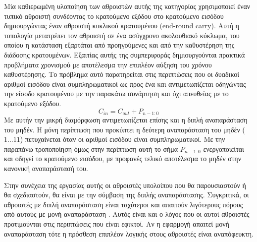 Μία καθιερωμένη υλοποίηση των αθροιστών αυτής της κατηγορίας χρησιμοποιεί έναν τυπικό αθροιστή
συνδέοντας το κρατούμενο εξόδου στο κρατούμενο εισόδου δημιουργώντας έναν αθροιστή κυκλικού
κρατουμένου (end-round carry). Αυτή η τοπολογία μετατρέπει τον αθροιστή σε ένα ασύγχρονο 
ακολουθιακό κύκλωμα, του οποίου η κατάσταση εξαρτάται από προηγούμενες και από την 
καθυστέρηση της διάδοσης κρατουμένων. Εξαιτίας αυτής της συμπεριφοράς δημιουργούνται
πρακτικά προβλήματα χρονισμού με αποτέλεσμα την επιπλέον αύξηση του χρόνου καθυστέρησης.
Το πρόβλημα αυτό παρατηρείται στις περιπτώσεις που οι δυαδικοί αριθμοί εισόδου 
είναι συμπληρωματικοί ως προς ένα και αντιμετωπίζεται \cite{1674817} οδηγώντας την είσοδο 
κρατουμένου με την παρακάτω συνάρτηση και όχι απευθείας με το κρατούμενο εξόδου.
\begin{equation}
    C_{in} = C_{out} + P_{n-1:0}
\end{equation}
Με αυτήν την μικρή διαμόρφωση αντιμετωπίζεται επίσης και η διπλή αναπαράσταση του μηδέν.
Η μόνη περίπτωση που προκύπτει η δεύτερη αναπαράσταση του μηδέν ($1...11$) πετυχαίνεται
όταν οι αριθμοί εισόδου είναι συμπληρωματικοί. Με την παραπάνω τροποποίηση όμως στην περίπτωση αυτή το σήμα $P_{n-1:0}$ ενεργοποιείται και οδηγεί το κρατούμενο εισόδου, 
με προφανές τελικό αποτέλεσμα το μηδέν στην κανονική αναπαράστασή του.

Στην συνέχεια της εργασίας αυτής οι αθροιστές υπολοίπου που θα παρουσιαστούν ή θα 
σχεδιαστούν, θα είναι με την σύμβαση της διπλής αναπαράστασης. Συγκριτικά, οι αθροιστές
με διπλή αναπαράσταση είναι ταχύτεροι και απαιτούν λιγότερους πόρους από αυτούς
με μονή αναπαράσταση \cite{298378}. Αυτός είναι και ο λόγος που οι αυτοί αθροιστές  
προτιμούνται στις περιπτώσεις που είναι εφικτοί. Αν η εφαρμογή απαιτεί μονή αναπαράσταση 
τότε η πρόσθεση επιπλέον λογικής στους αθροιστές είναι αναπόφευκτη.

















